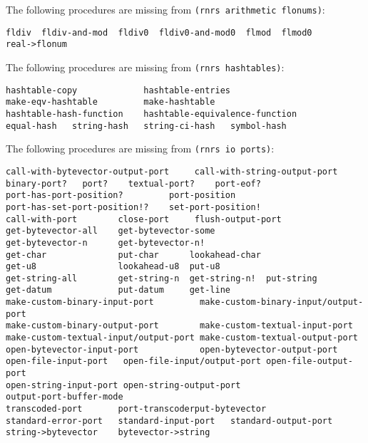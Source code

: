 \documentclass[onecolumn, 12pt, twoside, openright, dvipdfm]{book}
\begin{document}
The following procedures are missing from \texttt{(rnrs arithmetic
flonums)}:
\begin{Verbatim}
fldiv  fldiv-and-mod  fldiv0  fldiv0-and-mod0  flmod  flmod0 
real->flonum    
\end{Verbatim}

The following procedures are missing from \texttt{(rnrs hashtables)}:
\begin{Verbatim}
hashtable-copy             hashtable-entries  
make-eqv-hashtable         make-hashtable
hashtable-hash-function    hashtable-equivalence-function 
equal-hash   string-hash   string-ci-hash   symbol-hash
\end{Verbatim}



The following procedures are missing from \texttt{(rnrs io ports)}:
\begin{Verbatim}
call-with-bytevector-output-port     call-with-string-output-port
binary-port?   port?    textual-port?    port-eof?     
port-has-port-position?         port-position 
port-has-set-port-position!?    set-port-position!    
call-with-port        close-port     flush-output-port
get-bytevector-all    get-bytevector-some
get-bytevector-n      get-bytevector-n!
get-char              put-char      lookahead-char    
get-u8                lookahead-u8  put-u8
get-string-all        get-string-n  get-string-n!  put-string
get-datum             put-datum     get-line        
make-custom-binary-input-port         make-custom-binary-input/output-port    
make-custom-binary-output-port        make-custom-textual-input-port    
make-custom-textual-input/output-port make-custom-textual-output-port
open-bytevector-input-port            open-bytevector-output-port 
open-file-input-port   open-file-input/output-port open-file-output-port    
open-string-input-port open-string-output-port
output-port-buffer-mode
transcoded-port       port-transcoderput-bytevector 
standard-error-port   standard-input-port   standard-output-port 
string->bytevector    bytevector->string
\end{Verbatim}




\nocite{ghuloum-implicit}
\nocite{ghuloum-generation}

\backmatter
\appendix


\printindex
\end{document}
